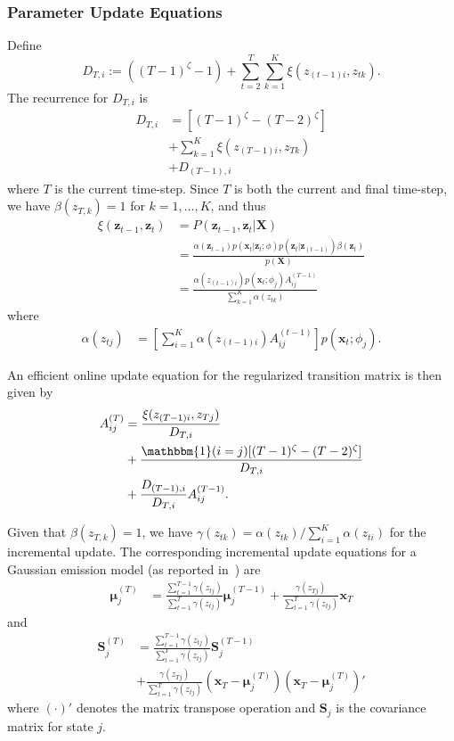 \documentclass[letterpaper]{article}
\begin{document}
\subsubsection{Parameter Update Equations}

Define 
\[
   D_{T,i} := ((T-1)^\zeta -1) + \sum_{t=2}^{T}\sum_{k=1}^{K} \xi(z_{(t-1)i}, z_{tk}).
\]
The recurrence for $D_{T,i}$ is
\begin{align*}
    D_{T,i} &= [(T-1)^\zeta - (T-2)^\zeta] \\
            &+ \sum_{k=1}^{K} \xi(z_{(T-1)i}, z_{Tk}) \\
            &+ D_{(T-1), i}
\end{align*}
where $T$ is the current time-step. Since $T$ is both the current and final time-step, we have $\beta(z_{T,k}) = 1$ for $k = 1, \ldots, K$, and thus
\begin{align*}
    \xi(\mathbf{z}_{t-1}, \mathbf{z}_{t}) 
            &= P(\mathbf{z}_{t-1}, \mathbf{z}_{t} | \mathbf{X}) \\
            &= \frac{\alpha(\mathbf{z}_{t-1})p(\mathbf{x}_t|\mathbf{z}_t; \phi)p(\mathbf{z}_{t}|\mathbf{z}_{(t-1)})\beta(\mathbf{z}_t)}{p(\mathbf{X})} \\
            &= \frac{\alpha(z_{(t-1)i})p(\mathbf{x}_t; \phi_j)A_{ij}^{(T-1)}}{\sum_{k=1}^{K}\alpha(z_{tk})}
\end{align*}
where
\begin{align*}
    \alpha(z_{tj}) &= \left[\sum_{i=1}^{K} \alpha(z_{(t-1)i})A_{ij}^{(t-1)}\right]p(\mathbf{x}_t; \phi_j).
\end{align*}

An efficient online update equation for the regularized transition matrix is then given by
\begin{align*}
    A_{ij}^{(T)} &= \frac{\xi(z_{(T-1)i}, z_{Tj})}{D_{T,i}} \\
                 &+ \frac{\mathbbm{1}(i = j)[(T-1)^\zeta - (T-2)^\zeta]}{D_{T,i}} \\
                 &+ \frac{D_{(T-1), i}}{D_{T,i}}A_{ij}^{(T-1)}.
\end{align*}

Given that $\beta(z_{T,k}) = 1$, we have $\gamma(z_{tk}) = \alpha(z_{tk}) / \sum_{i=1}^{K}\alpha(z_{ti})$ for the incremental update. The corresponding incremental update equations for a Gaussian emission model (as reported in~\cite{stenger2001}) are 
\begin{align*}
    \mathbf{\mu}_{j}^{(T)} &= \frac{\sum_{t=1}^{T-1}\gamma(z_{tj})}{\sum_{t=1}^{T}\gamma(z_{tj})}\mathbf{\mu}_{j}^{(T-1)} + \frac{\gamma(z_{Tj})}{\sum_{t=1}^{T}\gamma(z_{tj})}\mathbf{x}_T
\end{align*}
and
\begin{align*}
    \mathbf{S}_j^{(T)} &= \frac{\sum_{t=1}^{T-1}\gamma(z_{tj})}{\sum_{t=1}^{T}\gamma(z_{tj})}\mathbf{S}_j^{(T-1)} \\
                       &+ \frac{\gamma(z_{Tj})}{\sum_{t=1}^{T}\gamma(z_{tj})}\left(\mathbf{x}_T - \mathbf{\mu}_j^{(T)}\right)\left(\mathbf{x}_T - \mathbf{\mu}_j^{(T)}\right)'
\end{align*}
where $(\cdot)'$ denotes the matrix transpose operation and $\mathbf{S}_j$ is the covariance matrix for state $j$.
\end{document}
